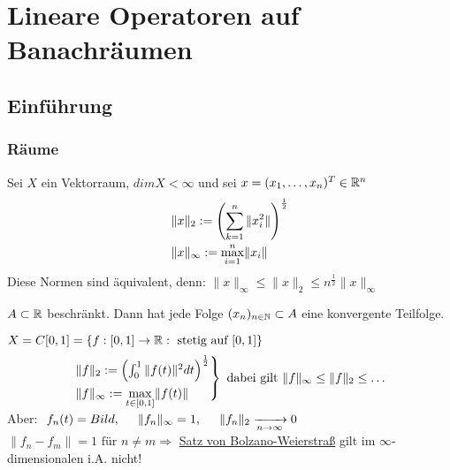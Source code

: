
\chapter{Lineare Operatoren auf Banachräumen}
\section{Einführung}
\subsection{Räume}

Sei $X$ ein Vektorraum, $dim X < \infty $ und sei $x = (x_{1},\dotsc,x_{n})^{T} \in \mathbb{R}^{n}$
\begin{align*}
	& \|x\|_{2} := \left(\sum_{k = 1}^{n} \|x_{i}^{2}\| \right)^{\frac{1}{2}}\\
	& \|x\|_{\infty} := \smash{\displaystyle\max_{i = 1}^{n}}  \|x_{i}\|		
\end{align*}

Diese Normen sind äquivalent, denn:
$\| x \|_{\infty} \leq \| x \|_{2} \leq n^{\frac{1}{2}} \| x \|_{\infty}$ \newline

\begin{satz*} \label{s:1-bolzanoweierstrass}
$A \subset \mathbb{R}$ beschränkt. Dann hat jede Folge $(x_{n})_{n \in \mathbb{N}} \subset A$ eine konvergente Teilfolge.
\end{satz*}

\begin{beispiel}
$X = C[0, 1] = \{ f : [0, 1] \rightarrow \mathbb{R}: \text{ stetig auf } [0, 1] \}$
\begin{align*}
\begin{rcases*}
\| f \|_{2} := \left( \int_{0}^{1} \| f(t) \|^{2} dt \right)^{\frac{1}{2}} \\
\| f \|_{\infty} :=  \smash{\displaystyle\max_{t \in [0, 1]}}  \| f(t) \|
\end{rcases*}\text{ dabei gilt } \| f \|_{\infty} \leq \| f \|_{2} \leq \dotsc 
\end{align*}
\newline
Aber:$\hspace{0.25cm} f_n(t) = Bild, \hspace{0.5cm} \| f_n \|_{\infty} = 1, \hspace{0.5cm} \| f_n \|_{2} \xrightarrow[n \rightarrow \infty]{} 0  $ \\
$ \| f_{n} - f_{m} \| = 1 \text{ für } n \neq m \Rightarrow $ \hyperref[s:1-bolzanoweierstrass]{Satz von Bolzano-Weierstraß} gilt im $\infty$-dimensionalen i.A. nicht!
\end{beispiel}

